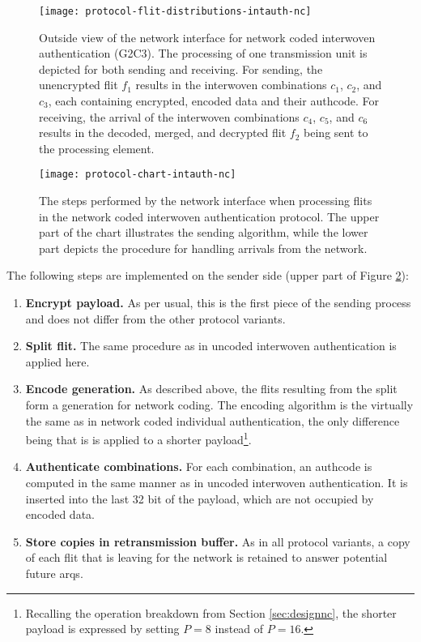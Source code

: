 \begin{figure}
    \centering
    \texttt{[image: protocol-flit-distributions-intauth-nc]}
    \caption[Network coded int. auth., outside view]{Outside view of the network interface for network coded interwoven authentication (G2C3). The
    processing of one transmission unit is depicted for both sending and receiving. For sending, the unencrypted flit $f_1$ results in the interwoven
    combinations $c_1$, $c_2$, and $c_3$, each containing encrypted, encoded data and their authcode. For receiving, the arrival of the interwoven
    combinations $c_4$, $c_5$, and $c_6$ results in the decoded, merged, and decrypted flit $f_2$ being sent to the processing element.}
    \label{fig:protflitdistintauthnc}
\end{figure}

\begin{figure}
    \centering
    \texttt{[image: protocol-chart-intauth-nc]}
    \caption[Network coded int. auth., detailed procedure]{The steps performed by the network interface when processing flits in the network coded
    interwoven authentication protocol. The upper part of the chart illustrates the sending algorithm, while the lower part depicts the procedure for
    handling arrivals from the network.}
    \label{fig:protchartintauthnc}
\end{figure}

The following steps are implemented on the sender side (upper part of Figure \ref{fig:protchartintauthnc}):
\begin{enumerate}
    \item \textbf{Encrypt payload.} As per usual, this is the first piece of the sending process and does not differ from the other protocol variants.
    \item \textbf{Split flit.} The same procedure as in uncoded interwoven authentication is applied here.
    \item \textbf{Encode generation.} As described above, the flits resulting from the split form a generation for network coding. The encoding
        algorithm is the virtually the same as in network coded individual authentication, the only difference being that is is applied to a shorter
        payload\footnote{Recalling the operation breakdown from Section \ref{sec:designnc}, the shorter payload is expressed by setting $P=8$ instead
        of $P=16$.}.
    \item \textbf{Authenticate combinations.} For each combination, an authcode is computed in the same manner as in uncoded interwoven
        authentication. It is inserted into the last 32 bit of the payload, which are not occupied by encoded data.
    \item \textbf{Store copies in retransmission buffer.} As in all protocol variants, a copy of each flit that is leaving for the network is retained
        to answer potential future \glspl{arq}.
\end{enumerate}
\vspace{0.5\baselineskip}

